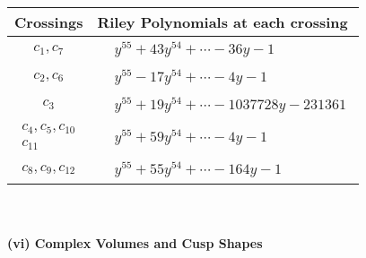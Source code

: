 \documentclass[1p]{elsarticle_modified}
\theoremstyle{definition}
\begin{document}
\begin{tabular}{m{50pt}|m{274pt}}
Crossings & \hspace{64pt}Riley Polynomials at each crossing \\
\hline $$\begin{aligned}c_{1},c_{7}\end{aligned}$$&$\begin{aligned}
&y^{55}+43 y^{54}+\cdots-36 y-1
\end{aligned}$\\
\hline $$\begin{aligned}c_{2},c_{6}\end{aligned}$$&$\begin{aligned}
&y^{55}-17 y^{54}+\cdots-4 y-1
\end{aligned}$\\
\hline $$\begin{aligned}c_{3}\end{aligned}$$&$\begin{aligned}
&y^{55}+19 y^{54}+\cdots-1037728 y-231361
\end{aligned}$\\
\hline $$\begin{aligned}c_{4},c_{5},c_{10}\\c_{11}\end{aligned}$$&$\begin{aligned}
&y^{55}+59 y^{54}+\cdots-4 y-1
\end{aligned}$\\
\hline $$\begin{aligned}c_{8},c_{9},c_{12}\end{aligned}$$&$\begin{aligned}
&y^{55}+55 y^{54}+\cdots-164 y-1
\end{aligned}$\\
\hline
\end{tabular}\\~\\
\newpage\flushleft \textbf{(vi) Complex Volumes and Cusp Shapes}
\end{document}
